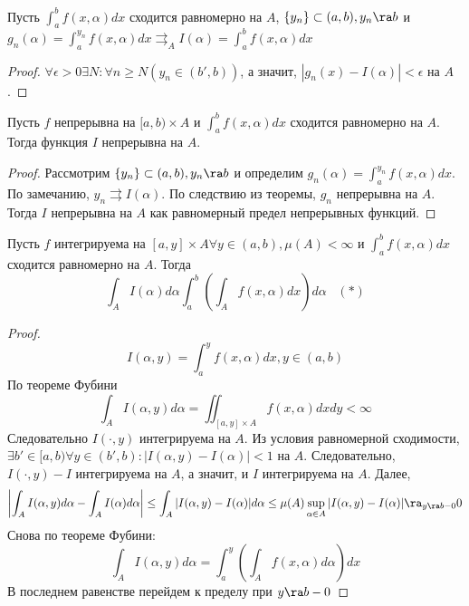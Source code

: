 \begin{note}
    Пусть \(\int_a^b f(x, \alpha) dx\) сходится равномерно на \(A\), \(\{y_n\} \subset (a, b), y_n \ra b\) и \(g_n(\alpha) = \int_a^{y_n} f(x, \alpha) dx \rightrightarrows_A I(\alpha) = \int_a^b f(x, \alpha) dx\)
\end{note}
\begin{proof}
    \(\forall \epsilon > 0 \exists N: \forall n \ge N (y_n \in (b', b))\), а значит, \(|g_n(x) - I(\alpha)| < \epsilon\) на \(A\).
\end{proof}

\begin{theorem}
    Пусть \(f\) непрерывна на \([a, b) \times A\) и \(\int_a^b f(x, \alpha)dx\) сходится равномерно на \(A\). Тогда функция \(I\) непрерывна на \(A\).
\end{theorem}
\begin{proof}
    Рассмотрим \(\{y_n\} \subset (a, b), y_n \ra b\) и определим \(g_n(\alpha) = \int_a^{y_n} f(x, \alpha) dx\). По замечанию, \(y_n \rightrightarrows I(\alpha)\). По следствию из теоремы, \(g_n\) непрерывна на \(A\). Тогда \(I\) непрерывна на \(A\) как равномерный предел непрерывных функций.
\end{proof}

\begin{theorem}
    Пусть \(f\) интегрируема на \([a, y] \times A \forall y \in (a, b), \mu(A) < \infty\) и \(\int_a^b f(x, \alpha) dx\) сходится равномерно на \(A\). Тогда
    \[\int_A I(\alpha) d\alpha \int_a^b \left( \int_A f(x, \alpha) dx \right) d\alpha\;\;\;(*)\]
\end{theorem}
\begin{proof}
    \[I(\alpha, y) = \int_a^y f(x, \alpha) dx, y \in (a, b)\]
    По теореме Фубини
    \[\int_A I(\alpha, y) d\alpha = \iint_{[a, y] \times A} f(x, \alpha )dxdy < \infty\]
    Следовательно \(I(\cdot, y)\) интегрируема на \(A\). Из условия равномерной сходимости, \(\exists b' \in [a, b) \forall y \in (b', b): |I(\alpha, y) - I(\alpha)| < 1\) на \(A\). Следовательно, \(I(\cdot, y) - I\) интегрируема на \(A\), а значит, и \(I\) интегрируема на \(A\). Далее,
    \[\left| \int_A I(\alpha, y) d\alpha - \int_A I(\alpha) d\alpha \right| \le \int_A |I(\alpha, y) - I(\alpha)| d\alpha \le \mu(A) \sup_{\alpha \in A} |I(\alpha, y) - I(\alpha)| \ra_{y \ra b - 0} 0\]
    Снова по теореме Фубини:
    \[\int_A I(\alpha, y) d\alpha = \int_a^y \left( \int_A f(x, \alpha) d\alpha \right) dx\]
    В последнем равенстве перейдем к пределу при \(y \ra b - 0\)
\end{proof}

